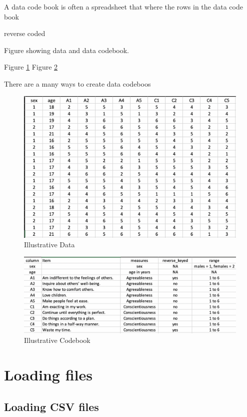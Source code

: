 \documentclass[
]{krantz}
\begin{document}
A data code book is often a spreadsheet that where the rows in the data code book

reverse coded

Figure showing data and data codebook.

Figure \ref{fig:bfidata}
Figure \ref{fig:bficodebook}

There are a many ways to create data codeboos

\begin{figure}
\includegraphics[width=0.85\linewidth]{ch_load_data/images/screenshot_bfi_data} \caption{Illustrative Data}\label{fig:bfidata}
\end{figure}

\begin{figure}
\includegraphics[width=0.85\linewidth]{ch_load_data/images/screenshot_bfi_codebook} \caption{Illustrative Codebook}\label{fig:bficodebook}
\end{figure}

\hypertarget{loading-files}{%
\section{Loading files}\label{loading-files}}

\hypertarget{loading-csv-files}{%
\subsection{Loading CSV files}\label{loading-csv-files}}
\end{document}
